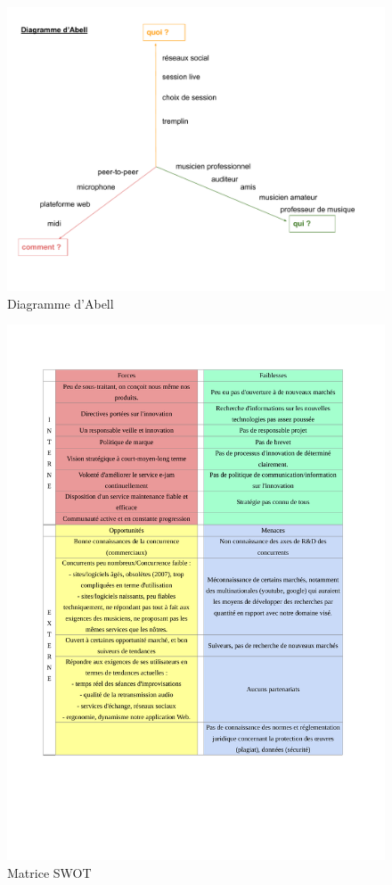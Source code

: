 \documentclass[a4,12pt]{article}
\begin{document}
\begin{figure}[!h]
    \centering
    \includegraphics[width=400pt]{Abell.pdf}
    \caption{Diagramme d'Abell}
    \label{fig:diagrammeAbel}
\end{figure}

\begin{figure}[H]
    \centering
    \includegraphics[scale=0.7]{SWOT.pdf}
    \caption{Matrice SWOT}
    \label{fig:SWOT}
\end{figure}
\end{document}
